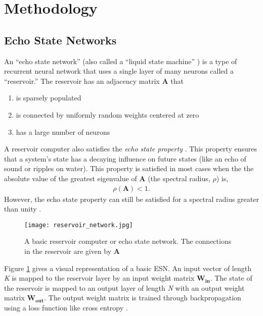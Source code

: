 \section{Methodology}

\subsection{Echo State Networks}
An ``echo state network'' (also
called a ``liquid state machine'' \cite{lukosevicius_practical_2012}) is a type
of recurrent neural network that uses a single layer of many neurons called a
``reservoir.'' The reservoir has an adjacency matrix $\bm{A}$ that
\begin{enumerate}
	\item is sparsely populated
	\item is connected by uniformly random weights centered at zero
	\item has a large number of neurons
\end{enumerate}
A reservoir computer also satisfies the \textit{echo state property}
\cite{pathak_model-free_2018, lukosevicius_reservoir_2009}. This
property ensures that a system's state has a decaying influence on future states
(like an echo of sound or ripples on water). This property is satisfied in most
cases when the the absolute value of the greatest eigenvalue of
$\bm{A}$ (the spectral radius, $\rho$) \cite{lukosevicius_reservoir_2009} is,
\begin{align}
	\rho(\bm{A}) < 1.
\end{align}
However, the echo state property can still be satisfied for a spectral radius
greater than unity \cite{lukosevicius_practical_2012}.

\begin{figure}[H]
	\texttt{[image: reservoir\_network.jpg]}
	\caption{A basic reservoir computer or echo state network. The connections in
	the reservoir are given by $\bm{A}$}
	\label{fig:RCmodel}
\end{figure}

Figure \ref{fig:RCmodel} gives a visual representation of a basic
\acrshort{ESN}. An
input vector of length \textit{K} is mapped to the reservoir layer by an input
weight matrix $\bm{W_{in}}$. The state of the reservoir is mapped to an output
layer of length \textit{N} with an output weight matrix $\bm{W_{out}}$.
The output weight matrix is trained through
backpropagation using a loss function like cross entropy
\cite{pathak_model-free_2018, vlachas_backpropagation_2020}.

